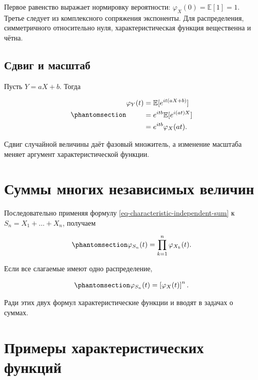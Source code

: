 \documentclass[
  russian,
  11pt,
  a4paper,
  open=any]{scrbook}
\begin{document}
Первое равенство выражает нормировку вероятности:
\(\varphi_X(0)=\mathbb E[1]=1\). Третье следует из комплексного
сопряжения экспоненты. Для распределения, симметричного относительно
нуля, характеристическая функция вещественна и чётна.

\subsection{Сдвиг и
масштаб}\label{ux441ux434ux432ux438ux433-ux438-ux43cux430ux441ux448ux442ux430ux431}

Пусть \(Y=aX+b\). Тогда

\begin{equation}\protect\phantomsection\label{eq-characteristic-affine-transform}{
\begin{aligned}
\varphi_Y(t)
&=\mathbb E[e^{it(aX+b)}]\\
&=e^{itb}\mathbb E[e^{i(at)X}]\\
&=e^{itb}\varphi_X(at).
\end{aligned}
}\end{equation}

Сдвиг случайной величины даёт фазовый множитель, а изменение масштаба
меняет аргумент характеристической функции.

\section{Суммы многих независимых
величин}\label{ux441ux443ux43cux43cux44b-ux43cux43dux43eux433ux438ux445-ux43dux435ux437ux430ux432ux438ux441ux438ux43cux44bux445-ux432ux435ux43bux438ux447ux438ux43d}

Последовательно применяя формулу \ref{eq-characteristic-independent-sum}
к \(S_n=X_1+\dots+X_n\), получаем

\begin{equation}\protect\phantomsection\label{eq-characteristic-many-sum}{
\varphi_{S_n}(t)=
\prod_{k=1}^{n}\varphi_{X_k}(t).
}\end{equation}

Если все слагаемые имеют одно распределение,

\begin{equation}\protect\phantomsection\label{eq-characteristic-iid-sum}{
\varphi_{S_n}(t)=\left[\varphi_X(t)\right]^n.
}\end{equation}

Ради этих двух формул характеристические функции и вводят в задачах о
суммах.

\section{Примеры характеристических
функций}\label{ux43fux440ux438ux43cux435ux440ux44b-ux445ux430ux440ux430ux43aux442ux435ux440ux438ux441ux442ux438ux447ux435ux441ux43aux438ux445-ux444ux443ux43dux43aux446ux438ux439}
\end{document}
